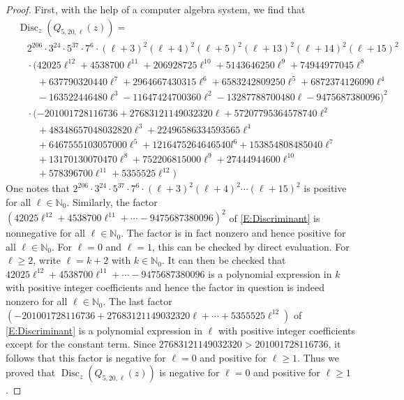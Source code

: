\documentclass[reqno,11pt,centertags]{amsart}
\newcommand{\bbN}{{\mathbb{N}}}
\newcommand{\<}{\langle}
\renewcommand{\>}{\rangle}
\newcommand{\no}{\nonumber}
\newcommand{\lb}{\label}
\numberwithin{equation}{section}
\theoremstyle{definition}
\begin{document}
\begin{proof}
First, with the help of a computer algebra system, we  find that 
%
\begin{align}  \lb{E:Discriminant}
&\operatorname{Disc}_z( Q_{5,20,\ell}(z))=\\ \no
&\quad 2^{206}\cdot 3^{24}\cdot  5^{37}\cdot 7^{6}\cdot  (\ell+3)^2 (\ell+4)^2 (\ell+5)^2 (\ell+13)^2 (\ell+14)^2 (\ell+15)^2 \\ \no
&\quad \cdot (42025 \ell^{12}+4538700 \ell^{11}+206928725 \ell^{10}+5143646250 \ell^9+74944977045 \ell^8\\ \no
&\quad\quad+637790320440 \ell^7+2964667430315 \ell^6+6583242809250 \ell^5+6872374126090 \ell^4\\ \no
&\quad\quad-163522446480 \ell^3-11647424700360 \ell^2-13287788700480 \ell-9475687380096)^2\\  \no
&\quad\cdot (-201001728116736 + 27683121149032320 \ell + 57207795364578740 \ell^2  \\ \no
&\quad\quad+ 48348657048032820 \ell^3 + 22496586334593565\ell^4  \\ \no
&\quad\quad+  6467555103057000 \ell^5 + 1216475264646540 l^6 + 153854808485040 \ell^7  \\ \no
&\quad\quad+  13170130070470 \ell^8 + 752206815000 \ell^9 + 27444944600 \ell^{10}  \\ \no
&\quad\quad+  578396700 \ell^{11} + 5355525 \ell^{12}) 
\end{align}
%
One notes that  $2^{206}\cdot 3^{24}\cdot  5^{37}\cdot 7^{6}\cdot  (\ell+3)^2 (\ell+4)^2\cdots  (\ell+15)^2$ is positive for all $\ell \in   \bbN_0$.
Similarly, the factor  $(42025 \ell^{12}+4538700 \ell^{11}+\cdots -9475687380096)^2$ of \eqref{E:Discriminant} is nonnegative for all $\ell \in \bbN_0$.
The factor is in fact nonzero and hence positive for all $\ell \in \bbN_0$. For $\ell=0$ and $\ell=1$, this can be checked by direct evaluation.
For $\ell\geq 2$, write $ \ell =k+2$ with  $k\in \bbN_0$. It can then be checked that $42025 \ell^{12}+4538700 \ell^{11}+\cdots -9475687380096$
is a polynomial expression in $k$ with positive integer coefficients and hence the factor in question is indeed nonzero for all $\ell \in \bbN_0$.
%
The last factor $(-201001728116736 + 27683121149032320 \ell +\cdots + 5355525 \ell^{12})$ of  \eqref{E:Discriminant} is a polynomial expression in $\ell$ 
with positive integer coefficients except for the constant term.
Since $27683121149032320>201001728116736$, it follows that this factor is negative for $\ell=0$ and positive for $\ell\geq 1$.
%
Thus we proved that  $\operatorname{Disc}_z( Q_{5,20,\ell}(z))$ is negative for  $\ell=0$ and positive for $\ell\geq 1$.


\end{proof}
\end{document}

